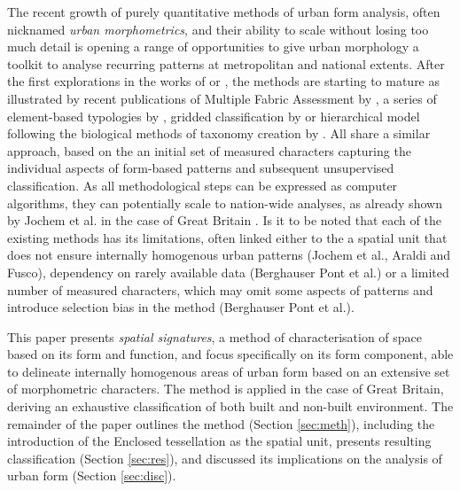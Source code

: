 The recent growth of purely quantitative methods of urban form analysis, often nicknamed
\textit{urban morphometrics}, and their ability to scale without losing too much detail
is opening a range of opportunities to give urban morphology a toolkit to analyse
recurring patterns at metropolitan and national extents. After the first explorations in
the works of \cite{gil2012} or \cite{hamaina2012a}, the methods are starting to mature
as illustrated by recent publications of Multiple Fabric Assessment by
\cite{araldi2019}, a series of element-based typologies by \cite{berghauserpont2019a},
gridded classification by \cite{jochem2020} or hierarchical model following the
biological methods of taxonomy creation by \cite{fleischmann2021a}. All share a similar
approach, based on the an initial set of measured characters capturing the individual
aspects of form-based patterns and subsequent unsupervised classification. As all
methodological steps can be expressed as computer algorithms, they can potentially scale
to nation-wide analyses, as already shown by Jochem et al. in the case of Great Britain
\citep{jochem2021tools}. Is it to be noted that each of the existing methods has its
limitations, often linked either to the a spatial unit that does not ensure internally
homogenous urban patterns (Jochem et al., Araldi and Fusco), dependency on rarely
available data (Berghauser Pont et al.) or a limited number of measured characters,
which may omit some aspects of patterns and introduce selection bias in the method
(Berghauser Pont et al.).

This paper presents \textit{spatial signatures}, a method of characterisation of space
based on its form and function, and focus specifically on its form component, able to
delineate internally homogenous areas of urban form based on an extensive set of
morphometric characters. The method is applied in the case of Great Britain, deriving an
exhaustive classification of both built and non-built environment. The remainder of the
paper outlines the method (Section \ref{sec:meth}), including the introduction of the
Enclosed tessellation as the spatial unit, presents resulting classification (Section
\ref{sec:res}), and discussed its implications on the analysis of urban form (Section
\ref{sec:disc}).